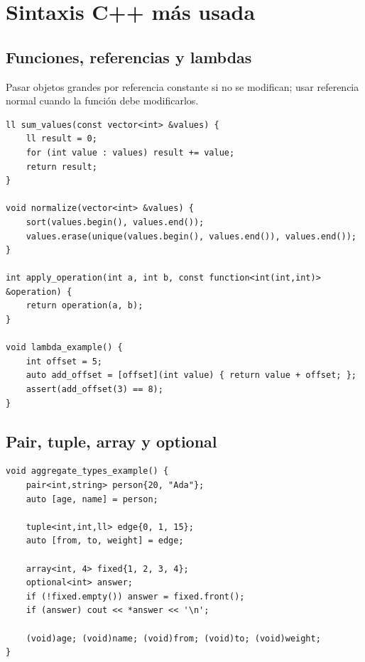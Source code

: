 \section{Sintaxis C++ m\'as usada}

\subsection{Funciones, referencias y lambdas}

Pasar objetos grandes por referencia constante si no se modifican; usar
referencia normal cuando la funci\'on debe modificarlos.

\begin{lstlisting}[style=cpp]
ll sum_values(const vector<int> &values) {
    ll result = 0;
    for (int value : values) result += value;
    return result;
}

void normalize(vector<int> &values) {
    sort(values.begin(), values.end());
    values.erase(unique(values.begin(), values.end()), values.end());
}

int apply_operation(int a, int b, const function<int(int,int)> &operation) {
    return operation(a, b);
}

void lambda_example() {
    int offset = 5;
    auto add_offset = [offset](int value) { return value + offset; };
    assert(add_offset(3) == 8);
}
\end{lstlisting}

\subsection{Pair, tuple, array y optional}

\begin{lstlisting}[style=cpp]
void aggregate_types_example() {
    pair<int,string> person{20, "Ada"};
    auto [age, name] = person;

    tuple<int,int,ll> edge{0, 1, 15};
    auto [from, to, weight] = edge;

    array<int, 4> fixed{1, 2, 3, 4};
    optional<int> answer;
    if (!fixed.empty()) answer = fixed.front();
    if (answer) cout << *answer << '\n';

    (void)age; (void)name; (void)from; (void)to; (void)weight;
}
\end{lstlisting}

